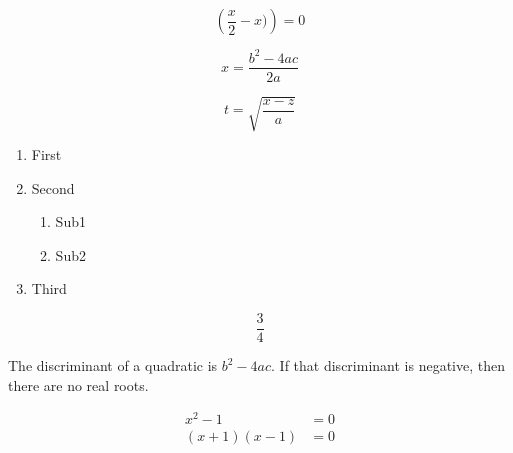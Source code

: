 \documentclass{article}
\begin{document}
$$\left( \frac{x}{2} - x ) \right) = 0$$

$$x = \frac{b^2-4ac}{2a}$$

$$ t = \sqrt{\frac{x-z}{a}}$$


\begin{enumerate}
\item First
\item Second
		\begin{enumerate}
		\item Sub1
		\item Sub2
		\end{enumerate}
\item Third
\end{enumerate}

$$\frac{3}{4}$$

The discriminant of a quadratic is $b^2 - 4ac$.  If that discriminant
is negative, then there are no real roots.

\begin{align*}
x^2-1 &= 0 \\
(x+1)(x-1) &=0
\end{align*}
\end{document}
